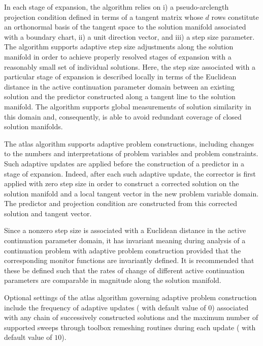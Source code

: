 In each stage of expansion, the  algorithm relies on i) a pseudo-arclength projection condition defined in terms of a tangent matrix whose $d$ rows constitute an orthonormal basis of the tangent space to the solution manifold associated with a boundary chart, ii) a unit direction vector, and iii) a step size parameter. The algorithm supports adaptive step size adjustments along the solution manifold in order to achieve properly resolved stages of expansion with a reasonably small set of individual solutions. Here, the step size associated with a particular stage of expansion is described locally in terms of the Euclidean distance in the active continuation parameter domain between an existing solution and the predictor constructed along a tangent line to the solution manifold. The algorithm supports global measurements of solution similarity in this domain and, consequently, is able to avoid redundant coverage of closed solution manifolds.

The  atlas algorithm supports adaptive problem constructions, including changes to the numbers and interpretations of problem variables and problem constraints. Such adaptive updates are applied before the construction of a predictor in a stage of expansion. Indeed, after each such adaptive update, the corrector is first applied with zero step size in order to construct a corrected solution on the solution manifold and a local tangent vector in the new problem variable domain. The predictor and projection condition are constructed from this corrected solution and tangent vector. 

Since a nonzero step size is associated with a Euclidean distance in the active continuation parameter domain, it has invariant meaning during analysis of a continuation problem with adaptive problem construction provided that the corresponding monitor functions are invariantly defined. It is recommended that these be defined such that the rates of change of different active continuation parameters are comparable in magnitude along the solution manifold.

Optional settings of the  atlas algorithm governing adaptive problem construction include the frequency of adaptive updates ( with default value of $0$) associated with any chain of successively constructed solutions and the maximum number of supported sweeps through toolbox remeshing routines during each update ( with default value of $10$).

